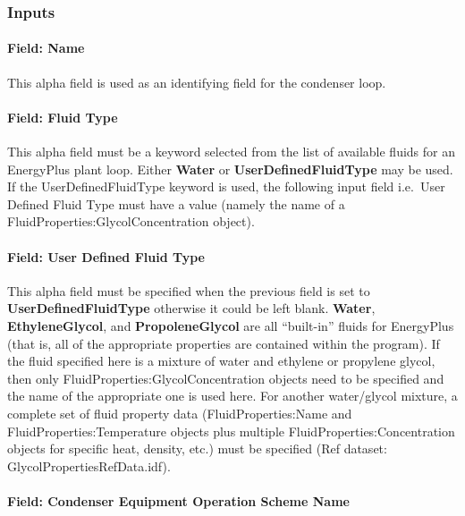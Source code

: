 \subsubsection{Inputs}\label{inputs-1-032}

\paragraph{Field: Name}\label{field-name-1-031}

This alpha field is used as an identifying field for the condenser loop.

\paragraph{Field: Fluid Type}\label{field-fluid-type-1-000}

This alpha field must be a keyword selected from the list of available fluids for an EnergyPlus plant loop. Either \textbf{Water} or \textbf{UserDefinedFluidType} may be used. If the UserDefinedFluidType keyword is used, the following input field i.e.~User Defined Fluid Type must have a value (namely the name of a FluidProperties:GlycolConcentration object).

\paragraph{Field: User Defined Fluid Type}\label{field-user-defined-fluid-type-1}

This alpha field must be specified when the previous field is set to \textbf{UserDefinedFluidType} otherwise it could be left blank. \textbf{Water}, \textbf{EthyleneGlycol}, and \textbf{PropoleneGlycol} are all ``built-in'' fluids for EnergyPlus (that is, all of the appropriate properties are contained within the program). If the fluid specified here is a mixture of water and ethylene or propylene glycol, then only FluidProperties:GlycolConcentration objects need to be specified and the name of the appropriate one is used here. For another water/glycol mixture, a complete set of fluid property data (FluidProperties:Name and FluidProperties:Temperature objects plus multiple FluidProperties:Concentration objects for specific heat, density, etc.) must be specified (Ref dataset: GlycolPropertiesRefData.idf).

\paragraph{Field: Condenser Equipment Operation Scheme Name}\label{field-condenser-equipment-operation-scheme-name}


